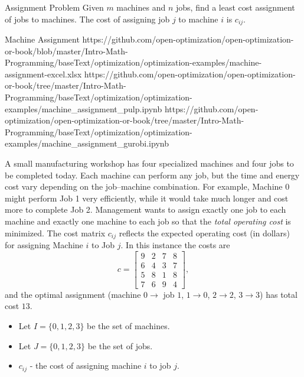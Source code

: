 \begin{general}{Assignment Problem}{}{}
Given $m$ machines and $n$ jobs, find a least cost assignment of jobs to machines. The cost of assigning job $j$ to machine $i$ is $c_{ij}$.
\end{general}
%

\begin{examplewithallcode}{Machine Assignment}
{https://github.com/open-optimization/open-optimization-or-book/blob/master/Intro-Math-Programming/baseText/optimization/optimization-examples/machine-assignment-excel.xlsx}
{https://github.com/open-optimization/open-optimization-or-book/tree/master/Intro-Math-Programming/baseText/optimization/optimization-examples/machine_assignment_pulp.ipynb}
{https://github.com/open-optimization/open-optimization-or-book/tree/master/Intro-Math-Programming/baseText/optimization/optimization-examples/machine_assignment_gurobi.ipynb}
\label{ex:machine-assignment}

A small manufacturing workshop has four specialized machines and four jobs to be completed today.  
Each machine can perform any job, but the time and energy cost vary depending on the job–machine combination.  
For example, Machine 0 might perform Job 1 very efficiently, while it would take much longer and cost more to complete Job 2.
Management wants to assign exactly one job to each machine and exactly one machine to each job so that the \emph{total operating cost} is minimized.  
The cost matrix \(c_{ij}\) reflects the expected operating cost (in dollars) for assigning Machine \(i\) to Job \(j\).  In this instance the costs are
\[
c = \begin{bmatrix} 9 & 2 & 7 & 8 \\ 6 & 4 & 3 & 7 \\ 5 & 8 & 1 & 8 \\ 7 & 6 & 9 & 4 \end{bmatrix},
\]
and the optimal assignment (machine $0 \to$ job $1$, $1 \to 0$, $2 \to 2$, $3 \to 3$) has total cost $13$.


\begin{itemize}
\item Let $I = \{0,1,2,3\}$ be the set of machines.
\item Let $J = \{0,1, 2,3\}$ be the set of jobs.
\end{itemize}

\begin{itemize}
\item $c_{ij}$ - the cost of assigning machine $i$ to job $j$.
\end{itemize}


\end{examplewithallcode}
